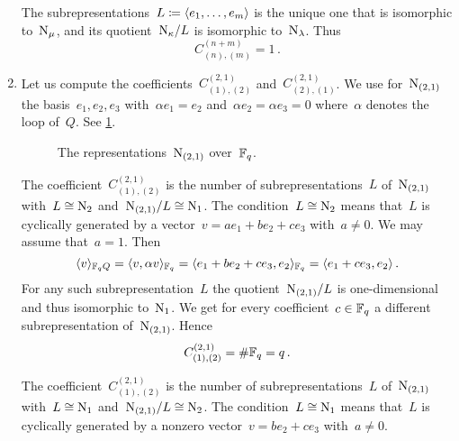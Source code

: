 \documentclass[a4paper,11pt]{scrartcl}
\begin{document}
\begin{example}
\begin{enumerate}
      The subrepresentations~$L \coloneqq \langle e_1, \dotsc, e_m\rangle$ is the unique one that is isomorphic to~$\mathrm{N}_\mu$, and its quotient~$\mathrm{N}_\kappa / L$ is isomorphic to~$\mathrm{N}_\lambda$.
      Thus
      \[
        C^{(n+m)}_{(n),(m)}
        =
        1 \,.
      \]
    \item
      Let us compute the coefficients~$C^{(2,1)}_{(1),(2)}$ and~$C^{(2,1)}_{(2),(1)}$.
      We use for~$\mathrm{N}_{(2,1)}$ the basis~$e_1, e_2, e_3$ with~$\alpha e_1 = e_2$ and~$\alpha e_2 = \alpha e_3 = 0$ where~$\alpha$ denotes the loop of~$Q$.
      See \cref{basis for 2 1}.
      \begin{figure}[tb]
        \centering
          \caption{The representations~$\mathrm{N}_{(2,1)}$ over~$\mathbb{F}_q$.}
        \label{basis for 2 1}
      \end{figure}

      The coefficient~$C^{(2,1)}_{(1),(2)}$ is the number of subrepresentations~$L$ of~$\mathrm{N}_{(2,1)}$ with~$L \cong \mathrm{N}_2$ and~$\mathrm{N}_{(2,1)}/L \cong \mathrm{N}_1$.
      The condition~$L \cong \mathrm{N}_2$ means that~$L$ is cyclically generated by a vector~$v = a e_1 + b e_2 + c e_3$ with~$a \neq 0$.
      We may assume that~$a = 1$.
      Then
      \[
        \langle v\rangle_{\mathbb{F}_q Q}
        =
        \langle v , \alpha v \rangle_{\mathbb{F}_q}
        =
        \langle e_1 + b e_2 + c e_3, e_2 \rangle_{\mathbb{F}_q}
        =
        \langle e_1 + c e_3, e_2 \rangle \,.
      \]
      For any such subrepresentation~$L$ the quotient~$\mathrm{N}_{(2,1)}/L$ is one-dimensional and thus isomorphic to~$\mathrm{N}_1$.
      We get for every coefficient~$c \in \mathbb{F}_q$ a different subrepresentation of~$\mathrm{N}_{(2,1)}$.
      Hence
      \[
        C^{(2,1)}_{(1),(2)}
        =
        \# \mathbb{F}_q
        =
        q \,.
      \]

      The coefficient~$C^{(2,1)}_{(1),(2)}$ is the number of subrepresentations~$L$ of~$\mathrm{N}_{(2,1)}$ with~$L \cong \mathrm{N}_1$ and~$\mathrm{N}_{(2,1)}/L \cong \mathrm{N}_2$.
      The condition~$L \cong \mathrm{N}_1$ means that~$L$ is cyclically generated by a nonzero vector~$v = b e_2 + c e_3$ with~$a \neq 0$.


\end{enumerate}
\end{example}
\end{document}
